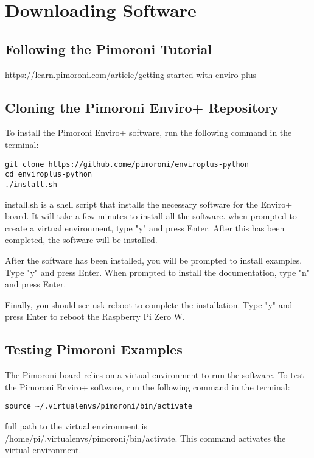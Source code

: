 \documentclass{article}
\begin{document}
\section{Downloading Software}

\subsection{Following the Pimoroni Tutorial}

\url{https://learn.pimoroni.com/article/getting-started-with-enviro-plus}

\subsection{Cloning the Pimoroni Enviro+ Repository}

To install the Pimoroni Enviro+ software, run the following command in the terminal:

\begin{verbatim}
git clone https://github.come/pimoroni/enviroplus-python
cd enviroplus-python
./install.sh
\end{verbatim}

install.sh is a shell script that installs the necessary software for the Enviro+ board. It will take a few minutes to install all the software. when prompted to create a virtual environment, type "y" and press Enter. After this has been completed, the software will be installed. 

After the software has been installed, you will be prompted to install examples. Type "y" and press Enter.
When prompted to install the documentation, type "n" and press Enter. 

Finally, you should see usk reboot to complete the installation. Type "y" and press Enter to reboot the Raspberry Pi Zero W.

\subsection{Testing Pimoroni Examples}

The Pimoroni board relies on a virtual environment to run the software. To test the Pimoroni Enviro+ software, run the following command in the terminal:

\begin{verbatim}
source ~/.virtualenvs/pimoroni/bin/activate
\end{verbatim}

full path to the virtual environment is /home/pi/.virtualenvs/pimoroni/bin/activate. This command activates the virtual environment.
\end{document}
